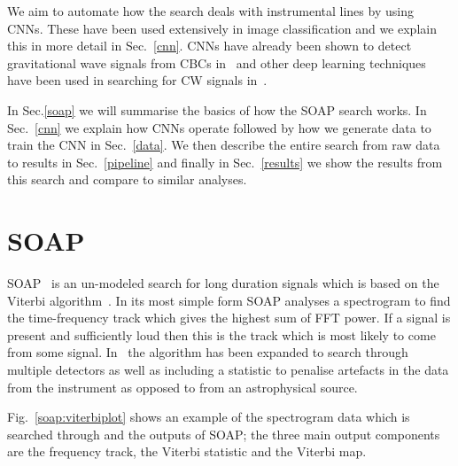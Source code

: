 %

We aim to automate how the search deals with instrumental lines by using \acp{CNN}.
These have been used extensively in image classification and we explain this in
more detail in Sec.~\ref{cnn}. \acp{CNN}
have already been shown to detect gravitational wave signals from \acp{CBC}
in~\cite{gabbard2018MatchingMatched,george2018DeepLearning,gebhard2019ConvolutionalNeural}
and other deep learning techniques have been used in searching for \ac{CW}
signals in~\cite{dreissigacker2019DeeplearningContinuous}. 

%
In Sec.\ref{soap} we will summarise the basics of how the SOAP search works. In
Sec.~\ref{cnn} we explain how \acp{CNN} operate followed by how we generate
data to train the \ac{CNN} in Sec.~\ref{data}. We then describe the entire search from raw data to results in Sec.~\ref{pipeline} and finally in Sec.~\ref{results} we
show the results from this search and compare to similar analyses. 

\section{\label{soap} SOAP}

%
SOAP~\cite{bayley2019SOAPGeneralised} is an un-modeled search for long
duration signals which is based on the Viterbi
algorithm~\cite{viterbi1967ErrorBounds}. In its most simple form SOAP
analyses a spectrogram to find the time-frequency track which gives the highest
sum of \ac{FFT} power. If a signal is present and sufficiently loud then this
is the track which is most likely to come from some signal.
In~\cite{bayley2019SOAPGeneralised} the algorithm has been expanded to
search through multiple detectors as well as including a statistic to penalise
artefacts in the data from the instrument as opposed to from an astrophysical
source. 

%
Fig.~\ref{soap:viterbiplot} shows an example of the spectrogram data which is
searched through and the outputs of SOAP; the three main output components are
the frequency track, the Viterbi statistic and the Viterbi map.

